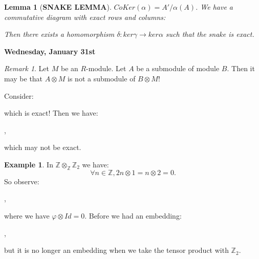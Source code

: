 \documentclass[12pt]{amsbook}
\theoremstyle{plain}
\numberwithin{section}{chapter}
\numberwithin{equation}{chapter}
\newtheorem{lem}[theorem]{Lemma}
\theoremstyle{definition}
\newtheorem{Ex}[theorem]{Example}
\theoremstyle{remark}
\newtheorem{rem}[theorem]{Remark}
\newcommand{\z}{\mathbb{Z}}
\newcommand{\tens}{\otimes}
\renewcommand{\phi}{\varphi}
\begin{document}
\begin{lem}[\textbf{SNAKE LEMMA}]
$CoKer(\alpha) = A'/\alpha(A)$. We have a commutative diagram with exact rows and columns:
\begin{center}
\end{center}


Then there exists a homomorphism $\delta:ker\gamma \to ker\alpha$ such that the snake is exact. 
\end{lem}

\textbf{Wednesday, January 31st}


\begin{rem}
Let $M$ be an $R$-module. Let $A$ be a submodule of module $B$. Then it may be that $A \tens M$ is not a submodule of $B \tens M$!

Consider:
\begin{center}
\end{center}
which is exact! Then we have:
\begin{center}
,
\end{center}
which may not be exact. 
\end{rem}

\begin{Ex}
In $\z \tens_\z \z_2$ we have:
$$
\forall n \in \z,2n \tens 1 = n \tens 2 = 0.
$$ 
So observe:
\begin{center}
,
\end{center}
where we have $\phi \tens Id = 0$. Before we had an embedding: 
\begin{center}
,
\end{center}
but it is no longer an embedding when we take the tensor product with $\z_2$. 
\end{Ex}
\end{document}
